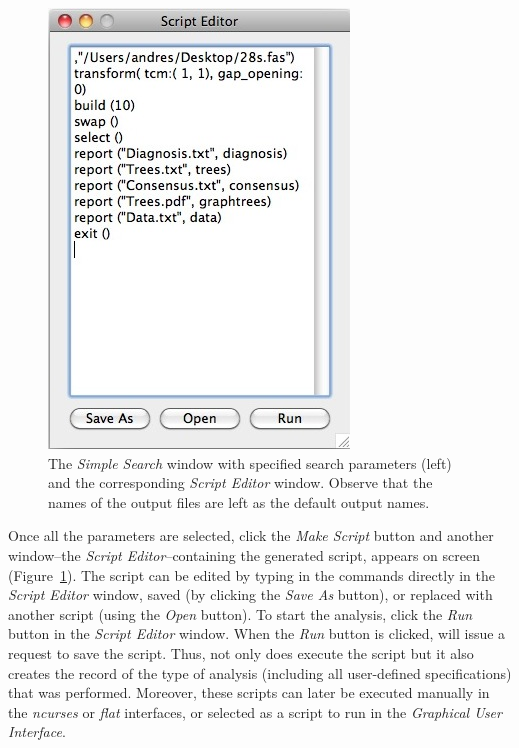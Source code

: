 \begin{figure}
\begin{minipage}[c]{0.52\textwidth}
	   	\includegraphics[width=\textwidth]{doc/figures/simplesearch_script.jpg}
   	\end{minipage}
	
    \caption{The \emph{Simple Search} window with specified search parameters (left) and the corresponding 
    \emph{Script Editor} window. Observe that the names of the output files are left as the default output names.}
    \label{fig:ScriptEditor_Window}
\end{figure}

Once all the parameters are selected, click the \emph{Make Script} button and another
window--the \emph{Script Editor}--containing the generated script, appears on screen (Figure~\ref{fig:ScriptEditor_Window}). 
The script can be edited by typing in the commands directly in the \emph{Script Editor} window,
 saved (by clicking the \emph{Save As} button), or replaced with another script (using 
 the \emph{Open} button). To start the analysis, click the \emph{Run} button in the 
 \emph{Script Editor} window. When the \emph{Run} button is clicked, \poy will issue a
 request to save the script. Thus, not only does \poy execute the script but
 it also creates the record of the type of analysis (including all user-defined specifications) that was performed.
 Moreover, these scripts can later be executed manually in the \emph{ncurses} or \emph{flat} interfaces, or
 selected as a script to run in the \emph{Graphical User Interface}.
 

